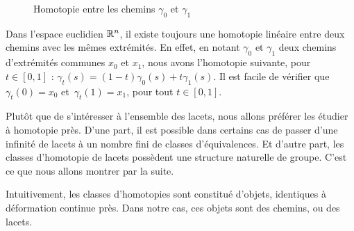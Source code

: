 \begin{figure}[H]
    \centering
    \caption{Homotopie entre les chemins $\gamma_0$ et $\gamma_1$}
    \label{tkz:path-homotopy}
\end{figure}

\begin{exemple}
Dans l'espace euclidien $\mathbb{R}^n$, il existe toujours une homotopie linéaire entre deux chemins avec les mêmes extrémités. En effet, en notant $\gamma_0$ et $\gamma_1$ deux chemins d'extrémités communes $x_0$ et $x_1$, nous avons l'homotopie suivante, pour~$t\in[0,1]$ :  $\gamma_t(s)=(1-t)\gamma_0(s)+t\gamma_1(s)$. Il est facile de vérifier que $\gamma_t(0)=x_0$ et~$\gamma_t(1)=x_1$, pour tout $t\in[0,1]$.
\end{exemple}

Plutôt que de s'intéresser à l'ensemble des lacets, nous allons préférer les étudier à homotopie près. D'une part, il est possible dans certains cas de passer d'une infinité de lacets à un nombre fini de classes d'équivalences. Et d'autre part, les classes d'homotopie de lacets possèdent une structure naturelle de groupe. C'est ce que nous allons montrer par la suite.

Intuitivement, les classes d'homotopies sont constitué d'objets, identiques à déformation continue près. Dans notre cas, ces objets sont des chemins, ou des lacets.

